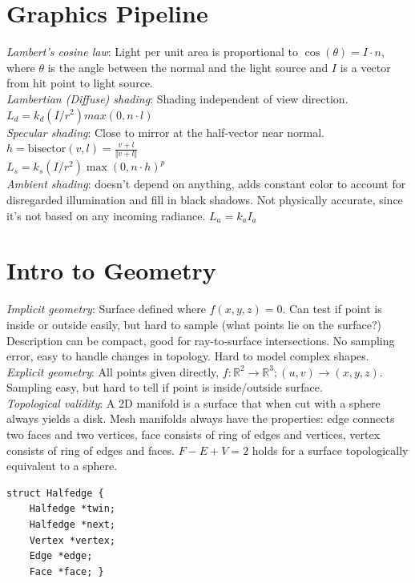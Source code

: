 \documentclass[10pt,landscape]{article}
\begin{document}
\begin{multicols}{3}
\section{Graphics Pipeline}

\textit{Lambert's cosine law}: Light per unit area is proportional to $\cos(\theta) = I \cdot n$, where $\theta$ is the angle between the normal and the light source and $I$ is a vector from hit point to light source. \\
\textit{Lambertian (Diffuse) shading}: Shading independent of view direction. $L_d = k_d (I / r^2) max(0, n\cdot l)$ \\
\textit{Specular shading}: Close to mirror at the half-vector near normal. $h = \text{bisector}(v, l) = \frac{v + l}{\Vert v + l \Vert}$ \\
$L_s = k_s(I / r^2) \max(0, n \cdot h)^p$ \\
\textit{Ambient shading}: doesn't depend on anything, adds constant color to account for disregarded illumination and fill in black shadows. Not physically accurate, since it's not based on any incoming radiance. $L_a = k_a I_a$


\section{Intro to Geometry}

\textit{Implicit geometry}: Surface defined where $f(x, y, z) = 0$. Can test if point is inside or outside easily, but hard to sample (what points lie on the surface?) Description can be compact, good for ray-to-surface intersections. No sampling error, easy to handle changes in topology. Hard to model complex shapes. \\
\textit{Explicit geometry}: All points given directly, $f : \mathbb{R}^2 \rightarrow \mathbb{R}^3; (u, v) \rightarrow (x, y, z)$. Sampling easy, but hard to tell if point is inside/outside surface. \\
\textit{Topological validity}: A 2D manifold is a surface that when cut with a sphere always yields a disk. Mesh manifolds always have the properties: edge connects two faces and two vertices, face consists of ring of edges and vertices, vertex consists of ring of edges and faces. $F - E + V = 2$ holds for a surface topologically equivalent to a sphere.

\begin{multicols}{2}
\begin{verbatim}
struct Halfedge {
    Halfedge *twin;
    Halfedge *next;
    Vertex *vertex;
    Edge *edge;
    Face *face; }
\end{verbatim}


\end{multicols}
\end{multicols}
\end{document}
